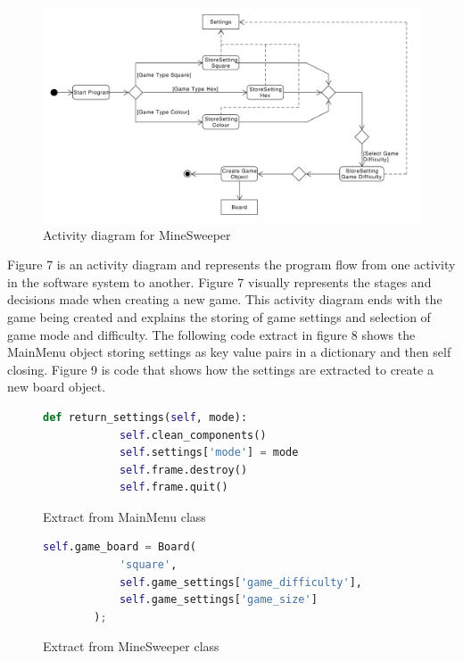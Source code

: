 \documentclass[12pt, a4]{report}
\begin{document}
\newpage
%
%
\begin{figure}[!h]
	\centering
	\includegraphics[scale=0.4]{ActivityDiagram}
	\caption{Activity diagram for MineSweeper}
\end{figure}
\par Figure 7 is an activity diagram and represents the program flow from one activity in the software system to another. Figure 7 visually represents the stages and decisions made when creating a new game. This activity diagram ends with the game being created and explains the storing of game settings and selection of game mode and difficulty. The following code extract in figure 8 shows the MainMenu object storing settings as key value pairs in a dictionary and then self closing. Figure 9 is code that shows how the settings are extracted to create a new board object.
\begin{figure}[!h]
	\label{view}
	\begin{lstlisting}[language=python]
		def return_settings(self, mode):
			self.clean_components()
			self.settings['mode'] = mode
			self.frame.destroy()
			self.frame.quit()
\end{lstlisting}
	\caption{Extract from MainMenu class}
\end{figure}
\begin{figure}[!h]
	\label{view}
	\begin{lstlisting}[language=python]
		self.game_board = Board(
			'square',
			self.game_settings['game_difficulty'],
			self.game_settings['game_size']
		);
\end{lstlisting}
	\caption{Extract from MineSweeper class}
\end{figure}
\end{document}
